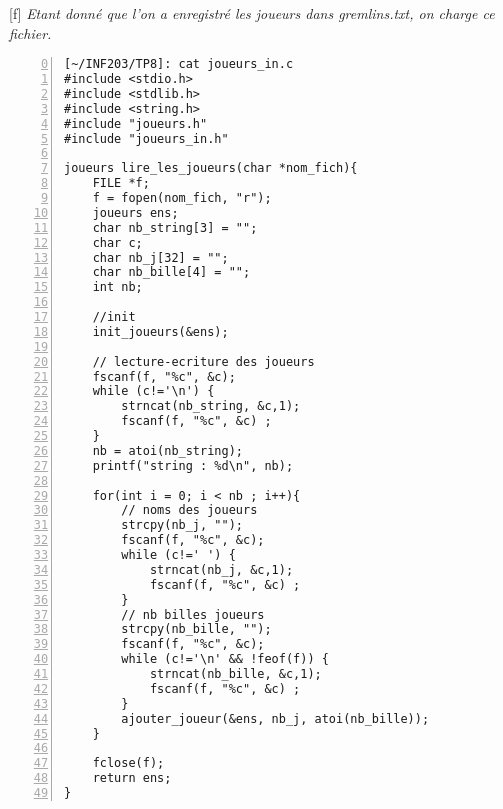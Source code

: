 \documentclass[12pt,a4paper,notitlepage,colorinlistoftodos]{article}
\begin{document}
[f]
\textit{Etant donné que l'on a enregistré les joueurs dans gremlins.txt, on charge ce fichier.}
\begin{lstlisting}[numbers=left, firstnumber = 0 ]
[~/INF203/TP8]: cat joueurs_in.c
#include <stdio.h>
#include <stdlib.h>
#include <string.h>
#include "joueurs.h"
#include "joueurs_in.h"

joueurs lire_les_joueurs(char *nom_fich){
    FILE *f;
    f = fopen(nom_fich, "r");
    joueurs ens;
    char nb_string[3] = "";
    char c;
    char nb_j[32] = "";
    char nb_bille[4] = "";
    int nb;

    //init
    init_joueurs(&ens); 

    // lecture-ecriture des joueurs
    fscanf(f, "%c", &c);
    while (c!='\n') {	
        strncat(nb_string, &c,1);
        fscanf(f, "%c", &c) ;   
    }
    nb = atoi(nb_string);
    printf("string : %d\n", nb);
    
    for(int i = 0; i < nb ; i++){
        // noms des joueurs
        strcpy(nb_j, "");
        fscanf(f, "%c", &c);
        while (c!=' ') {	
            strncat(nb_j, &c,1);
            fscanf(f, "%c", &c) ;   
        }
        // nb billes joueurs
        strcpy(nb_bille, "");
        fscanf(f, "%c", &c);
        while (c!='\n' && !feof(f)) {	
            strncat(nb_bille, &c,1);
            fscanf(f, "%c", &c) ;   
        }
        ajouter_joueur(&ens, nb_j, atoi(nb_bille));
    }
    
    fclose(f);
    return ens;
}
\end{lstlisting}





\cite{}


\end{document}
